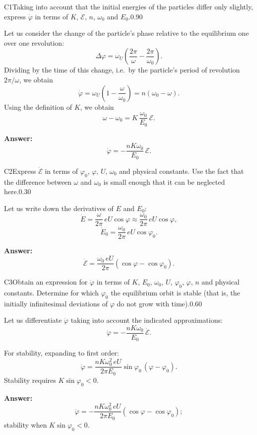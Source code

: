 \documentclass[11pt,a4paper]{article}
\begin{document}
\begin{solcard}{C1}{Taking into account that the initial energies of the particles differ only slightly, express $\dot\varphi$ in terms of $K$, $\mathcal E$, $n$, $\omega_0$ and $E_0$.}{0.90}

Let us consider the change of the particle's phase relative to the equilibrium one over one revolution: $$\Delta\varphi = \omega_U\!\left(\frac{2\pi}{\omega} - \frac{2\pi}{\omega_0}\right).$$ Dividing by the time of this change, i.e.\ by the particle's period of revolution $2\pi/\omega$, we obtain $$\dot\varphi = \omega_U\!\left(1-\frac{\omega}{\omega_0}\right) = n(\omega_0 - \omega).$$ Using the definition of $K$, we obtain $$\omega - \omega_0 = K\,\frac{\omega_0}{E_0}\,\mathcal E.$$

\par\smallskip\noindent\textbf{Answer:} $$\dot\varphi = -\frac{nK\omega_0}{E_0}\,\mathcal E.$$
\end{solcard}

\begin{solcard}{C2}{Express $\dot{\mathcal E}$ in terms of $\varphi_0$, $\varphi$, $U$, $\omega_0$ and physical constants. Use the fact that the difference between $\omega$ and $\omega_0$ is small enough that it can be neglected here.}{0.30}

Let us write down the derivatives of $E$ and $E_0$: $$\dot E = \frac{\omega}{2\pi}\,eU\cos\varphi \approx \frac{\omega_0}{2\pi}\,eU\cos\varphi,$$ $$\dot E_0 = \frac{\omega_0}{2\pi}\,eU\cos\varphi_0.$$

\par\smallskip\noindent\textbf{Answer:} $$\dot{\mathcal E} = \frac{\omega_0\,eU}{2\pi}\left(\cos\varphi - \cos\varphi_0\right).$$
\end{solcard}

\begin{solcard}{C3}{Obtain an expression for $\ddot\varphi$ in terms of $K$, $E_0$, $\omega_0$, $U$, $\varphi_0$, $\varphi$, $n$ and physical constants. Determine for which $\varphi_0$ the equilibrium orbit is stable (that is, the initially infinitesimal deviations of $\varphi$ do not grow with time).}{0.60}

Let us differentiate $\dot\varphi$ taking into account the indicated approximations: $$\ddot\varphi = -\frac{nK\omega_0}{E_0}\,\dot{\mathcal E}.$$

For stability, expanding to first order: $$\ddot\varphi = \frac{nK\omega_0^2\,eU}{2\pi E_0}\sin\varphi_0\,(\varphi - \varphi_0).$$ Stability requires $K\sin\varphi_0 < 0$.

\par\smallskip\noindent\textbf{Answer:} $$\ddot\varphi = -\frac{nK\omega_0^2\,eU}{2\pi E_0}\left(\cos\varphi - \cos\varphi_0\right);$$ stability when $K\sin\varphi_0 < 0$.
\end{solcard}
\end{document}
